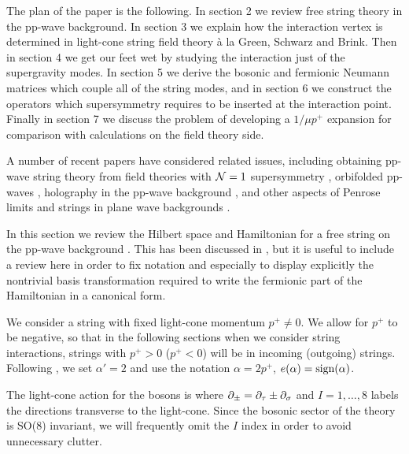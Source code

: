 The plan of the paper is the following.
In section 2 we review free string theory in the pp-wave background.
In section 3 we explain how the interaction vertex is
determined in light-cone string field theory \`a la Green,
Schwarz and Brink.
Then in section 4 we get our feet wet by studying the interaction
just of the supergravity modes.
In section 5 we derive the bosonic and fermionic Neumann matrices which
couple all of the string modes, and in section 6 we construct the
operators which supersymmetry requires to be inserted at
the interaction point.  Finally in section 7 we discuss
the problem of developing a $1/\mu p^+$ expansion for comparison
with calculations on the field theory side.

A number of recent papers have considered related
issues, including obtaining pp-wave string theory from field theories
with ${\cal{N}}=1$ supersymmetry , orbifolded pp-waves , holography in the pp-wave background
,
and other aspects of Penrose limits and strings
in plane wave backgrounds
.


In this section we review 
the Hilbert space and Hamiltonian for
a free string on the pp-wave background \ppsol.  This has been
discussed in , but it is useful to include
a review here in order to fix notation and especially to display
explicitly the nontrivial basis transformation required to write
the fermionic part of the Hamiltonian in a canonical form.

We consider a string 
with fixed light-cone momentum $p^+ \ne 0$.
We allow for $p^+$ to be negative, so that in the following
sections when we consider string interactions, strings with $p^+ > 0$
($p^+ < 0$) will be in incoming (outgoing) strings.
Following \GSB, we  set $\alpha' = 2$ and use the notation
$\alpha = 2 p^+$, $e(\alpha) = {\rm sign}(\alpha)$.


The light-cone action for the bosons is
\eqn{}
where $\partial_\pm = \partial_\tau \pm \partial_\sigma$ and $I=1,\ldots,8$ labels
the directions transverse to the light-cone.
Since the bosonic sector of the theory is SO(8) invariant, we will
frequently omit the $I$ index in order to avoid unnecessary clutter.

